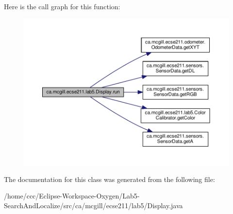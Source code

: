 Here is the call graph for this function\+:\nopagebreak
\begin{figure}[H]
\begin{center}
\leavevmode
\includegraphics[width=350pt]{classca_1_1mcgill_1_1ecse211_1_1lab5_1_1_display_a047e885f7170ba80f60fd3b4b2bc79a9_cgraph}
\end{center}
\end{figure}


The documentation for this class was generated from the following file\+:\begin{DoxyCompactItemize}
\item 
/home/ccc/\+Eclipse-\/\+Workspace-\/\+Oxygen/\+Lab5-\/\+Search\+And\+Localize/src/ca/mcgill/ecse211/lab5/Display.\+java\end{DoxyCompactItemize}
